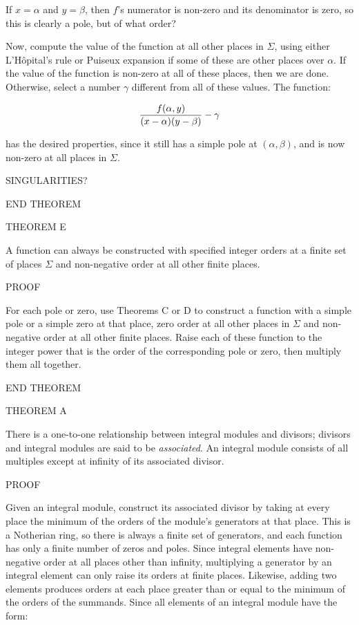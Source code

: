 If $x=\alpha$ and $y=\beta$, then $f$'s numerator is non-zero and its
denominator is zero, so this is clearly a pole, but of what order?

Now, compute the value of the function at all other places in
$\Sigma$, using either L'H\^opital's rule or Puiseux expansion if some
of these are other places over $\alpha$.  If the value of the function
is non-zero at all of these places, then we are done.  Otherwise,
select a number $\gamma$ different from all of these values.  The
function:

$${f(\alpha,y)\over(x-\alpha)(y-\beta)} - \gamma$$

has the desired properties, since it still has a simple pole at
$(\alpha,\beta)$, and is now non-zero at all places in $\Sigma$.

SINGULARITIES?

END THEOREM

THEOREM E

A function can always be constructed with specified integer orders at
a finite set of places $\Sigma$ and non-negative order at all other finite
places.

PROOF

For each pole or zero, use Theorems C or D to construct a function
with a simple pole or a simple zero at that place, zero order at all
other places in $\Sigma$ and non-negative order at all other finite
places.  Raise each of these function to the integer power that is the
order of the corresponding pole or zero, then multiply them all
together.

END THEOREM

THEOREM A

There is a one-to-one relationship between integral modules and
divisors; divisors and integral modules are said to be {\it
associated}.  An integral module consists of all multiples except at
infinity of its associated divisor.

PROOF

Given an integral module, construct its associated divisor by taking
at every place the minimum of the orders of the module's generators at
that place.  This is a Notherian ring, so there is always a finite set
of generators, and each function has only a finite number of zeros and
poles.  Since integral elements have non-negative order at all places
other than infinity, multiplying a generator by an integral element
can only raise its orders at finite places.  Likewise, adding two
elements produces orders at each place greater than or equal to the
minimum of the orders of the summands.  Since all elements of an
integral module have the form:

